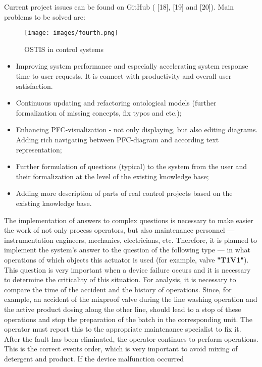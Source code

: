 \documentclass[twocolumn]{scndocument}
\begin{document}
Current project issues can be found on GitHub ( [18],
[19] and [20]). Main problems to be solved are:
\newpage

\begin{figure}[h]
    \centering
    \texttt{[image: images/fourth.png]} 
    \caption{OSTIS in control systems}
    \label{рис 10}
\end{figure}


\begin{itemize}
\item  Improving system performance and especially accelerating system response time to user requests.
It is connect with productivity and overall user
satisfaction.

\item Continuous updating and refactoring ontological
models (further formalization of missing concepts,
fix typos and etc.);

\item  Enhancing PFC-visualization - not only displaying,
but also editing diagrams. Adding rich navigating
between PFC-diagram and according text representation;

\item  Further formulation of questions (typical) to the
system from the user and their formalization at the
level of the existing knowledge base;

\item Adding more description of parts of real control
projects based on the existing knowledge base.
\end{itemize}

The implementation of answers to complex questions
is necessary to make easier the work of not only process
operators, but also maintenance personnel — instrumentation engineers, mechanics, electricians, etc. Therefore,
it is planned to implement the system’s answer to the
question of the following type — in what operations
of which objects this actuator is used (for example,
valve \textbf{"T1V1"}). This question is very important when a
device failure occurs and it is necessary to determine the
criticality of this situation. For analysis, it is necessary
to compare the time of the accident and the history of
operations. Since, for example, an accident of the mixproof valve during the line washing operation and the
active product dosing along the other line, should lead
to a stop of these operations and stop the preparation of
the batch in the corresponding unit. The operator must
report this to the appropriate maintenance specialist to
fix it. After the fault has been eliminated, the operator
continues to perform operations. This is the correct
events order, which is very important to avoid mixing of
detergent and product. If the device malfunction occurred
\newpage
\end{document}

